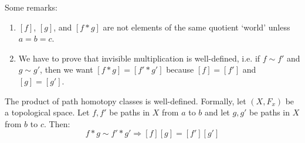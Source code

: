 Some remarks:
\begin{enumerate} 
\item  $[f]$, $[g]$, and $[f \ast g]$ are not elements of the same quotient `world' unless $a = b = c$.
\item We have to prove that invisible multiplication is well-defined, i.e. if $f \sim f'$ and $g \sim g'$, then we want $[f \ast g] = [f' \ast g']$ because $[f] = [f']$ and $[g] = [g']$.
\end{enumerate}

\begin{lemma}[Important]
The product of path homotopy classes is well-defined. Formally, let $(X,F_x)$ be a topological space. Let $f,f'$ be paths in $X$ from $a$ to $b$ and let $g,g'$ be paths in $X$ from $b$ to $c$. Then:
\[f*g \sim f'*g' \Rightarrow [f][g] = [f'][g']\]
\end{lemma}

